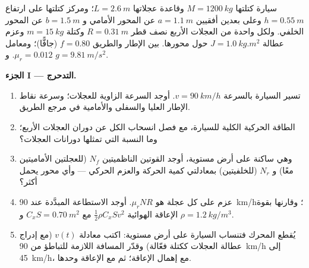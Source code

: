 \begin{problem}
\label{pb:b2:rigid-body-mechanics:1}

سيارة كتلتها $M = \qty{1200}{kg}$ وقاعدة عجلاتها $L = \qty{2.6}{m}$؛
ومركز كتلتها على ارتفاع $h = \qty{0.55}{m}$ وعلى بعدين أفقيين
$a = \qty{1.1}{m}$ عن المحور الأمامي و $b = \qty{1.5}{m}$ عن المحور
الخلفي. ولكل واحدة من العجلات الأربع نصف قطر $R = \qty{0.31}{m}$ وكتلة $m =
\qty{15}{kg}$ وعزم عطالة $J = \qty{1.0}{kg.m^2}$ حول محورها.
 بين الإطار والطريق $f = 0.80$ (جافًّا)؛ ومعامل
 $\mu_r = 0.012$. و $g = \qty{9.81}{m/s^2}$.

\medskip
\noindent\textbf{الجزء I --- التدحرج.}
\begin{enumerate}
  \item تسير السيارة بالسرعة $v = \qty{90}{km/h}$. أوجد السرعة الزاوية
        للعجلات؛ وسرعة نقاط الإطار العليا والسفلى والأمامية في
        مرجع الطريق.
  \item الطاقة الحركية الكلية للسيارة، مع فصل انسحاب الكل عن
        دوران العجلات الأربع؛ وما النسبة التي تمثلها دورانات
        العجلات؟
  \item وهي ساكنة على أرض مستوية، أوجد القوتين الناظميتين $N_f$
        (للعجلتين الأماميتين معًا) و $N_r$ (للخلفيتين) بمعادلتي
        كمية الحركة والعزم الحركي --- وأي محور يحمل أكثر؟
  \item عزم  على كل عجلة هو $\mu_rNR$. أوجد
        الاستطاعة المبدَّدة  عند \qty{90}{km/h}؛
        وقارنها بقوة الإعاقة الهوائية $\tfrac12\rho C_xSv^2$ مع $C_xS =
        \qty{0.70}{m^2}$ و $\rho = \qty{1.2}{kg/m^3}$.
  \item يُقطع المحرك فتنساب السيارة على أرض مستوية: اكتب معادلة
        $v(t)$ (مع إدراج عطالة العجلات ككتلة فعّالة) وقدّر المسافة
        اللازمة للتباطؤ من \qty{90}{km/h} إلى
        \qty{45}{km/h}، مع إهمال الإعاقة؛ ثم مع الإعاقة وحدها.
\end{enumerate}


\end{problem}
